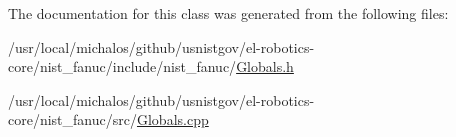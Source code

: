 The documentation for this class was generated from the following files\-:\begin{DoxyCompactItemize}
\item 
/usr/local/michalos/github/usnistgov/el-\/robotics-\/core/nist\-\_\-fanuc/include/nist\-\_\-fanuc/\hyperlink{Globals_8h}{Globals.\-h}\item 
/usr/local/michalos/github/usnistgov/el-\/robotics-\/core/nist\-\_\-fanuc/src/\hyperlink{Globals_8cpp}{Globals.\-cpp}\end{DoxyCompactItemize}
